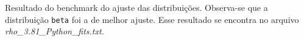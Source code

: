 \begin{figure}[ht!]
	\vspace{0mm}	%
	\begin{center}
	\end{center}
	\vspace{-2mm}	%
	\label{ex4_fig1}
\end{figure}

Resultado do benchmark do ajuste das distribuições. Observa-se que a distribuição \texttt{beta} foi a de melhor ajuste. Esse resultado se encontra no arquivo \textit{rho\_3.81\_Python\_fits.txt}.

